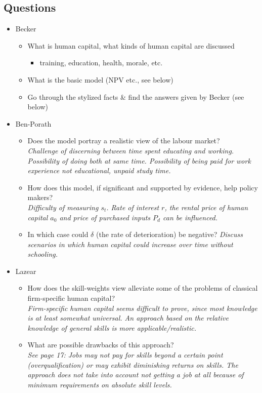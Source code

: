 \documentclass[12pt,a4paper]{article}
\begin{document}
  \subsection{Questions} %
  \begin{itemize}
    \item Becker
      \begin{itemize}
        \item What is human capital, what kinds of human capital are discussed
          \begin{itemize}
            \item training, education, health, morale, etc.
          \end{itemize}
        \item What is the basic model (NPV etc., see below)
        \item Go through the stylized facts \& find the answers given by Becker (see below)
      \end{itemize}

    \item Ben-Porath
      \begin{itemize}
        \item Does the model portray a realistic view of the labour market? \\
          \emph{Challenge of discerning between time spent educating and working. Possibility of doing both at same time. Possibility of being paid for work experience not educational, unpaid study time.}
        \item How does this model, if significant and supported by evidence, help policy makers? \\
          \emph{Difficulty of measuring $s_t$. Rate of interest $r$, the rental price of human capital $a_0$ and price of purchased inputs $P_d$ can be influenced.}
        \item In which case could $\delta$ (the rate of deterioration) be negative?
          \emph{Discuss scenarios in which human capital could increase over time without schooling.}
      \end{itemize}

    \item Lazear
      \begin{itemize}
        \item How does the skill-weights view alleviate some of the problems of classical firm-specific human capital? \\
          \emph{Firm-specific human capital seems difficult to prove, since most knowledge is at least somewhat universal. An approach based on the relative knowledge of general skills is more applicable/realistic.}
        \item What are possible drawbacks of this approach? \\
          \emph{See page 17: Jobs may not pay for skills beyond a certain point (overqualification) or may exhibit diminishing returns on skills. The approach does not take into account not getting a job at all because of minimum requirements on absolute skill levels.}
      \end{itemize}

  \end{itemize}
\end{document}
